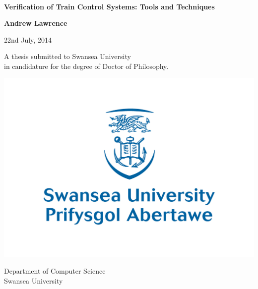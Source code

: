 \documentclass[11pt, a4paper, twoside, openright]{book}
\begin{document}
${ \ } $ \vspace{4cm}
%
%


\begin{center}
{\huge \bf Verification of Train Control Systems: Tools and Techniques}
\end{center}

\begin{center}
{\large \bf Andrew Lawrence}
\end{center}

\begin{center}
22nd July, 2014
\end{center}

\vspace{2.5cm}



\vfill

\begin{center}
A thesis submitted to Swansea University\\
in candidature for the degree of Doctor of Philosophy.
\end{center}

\begin{center}
\includegraphics[scale=0.4]{logo} 
\end{center}

\begin{center}
Department of Computer Science\\
Swansea University
\end{center}
\end{document}
